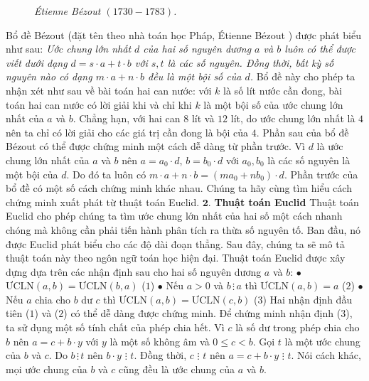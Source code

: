 \begin{multicols}{2}
\begin{figure}[H]
		\caption{\small\textit{\color{hoccungpi}Étienne Bézout $(1730 - 1783)$.}}
		\vspace*{-10pt}
	\end{figure}
	Bổ đề Bézout (đặt tên theo nhà toán học Pháp, Étienne Bézout ) được phát biểu như sau:
	\vskip 0.1cm
	\textit{Ước chung lớn nhất $d$ của hai số nguyên dương $a$ và $b$ luôn có thể được viết dưới dạng $d=s\cdot a+t\cdot b$ với $s,t$ là các số nguyên. Đồng thời, bất kỳ số nguyên nào có dạng $m\cdot a+n\cdot b$ đều là một bội số của $d$.}
	\vskip 0.1cm
	Bổ đề này cho phép ta nhận xét như sau về bài toán hai can nước: với $k$ là số lít nước cần đong, bài toán hai can nước có lời giải khi và chỉ khi $k$ là một bội số của ước chung lớn nhất của $a$ và $b$. Chẳng hạn, với hai can $8$ lít và $12$ lít, do ước chung lớn nhất là $4$ nên ta chỉ có lời giải cho các giá trị cần đong là bội của $4$.
	\vskip 0.1cm 
	Phần sau của bổ đề Bézout có thể được chứng minh một cách dễ dàng từ phần trước. Vì $d$ là ước chung lớn nhất của $a$ và $b$ nên $a=a_0\cdot d$, $b=b_0\cdot d$ với $a_0, b_0$ là các số nguyên là một bội của $d$. Do đó ta luôn có $m\cdot a+n\cdot b=(ma_0+nb_0)\cdot d$.
	\vskip 0.1cm
	Phần trước của bổ đề có một số cách chứng minh khác nhau. Chúng ta hãy cùng tìm hiểu cách chứng minh xuất phát từ thuật toán Euclid. 
	\vskip 0.1cm
	$\pmb{2.}$ \textbf{\color{hoccungpi}Thuật toán Euclid}
	\vskip 0.1cm
	Thuật toán Euclid cho phép chúng ta tìm ước chung lớn nhất của hai số một cách nhanh chóng mà không cần phải tiến hành phân tích ra thừa số nguyên tố. Ban đầu, nó được Euclid phát biểu cho các độ dài đoạn thẳng. Sau đây, chúng ta sẽ mô tả thuật toán này theo ngôn ngữ toán học hiện đại.
	\vskip 0.1cm
	Thuật toán Euclid được xây dựng dựa trên các nhận định sau cho hai số nguyên dương $a$ và $b$:
	\vskip 0.1cm
	$\bullet$ $\text{ƯCLN}(a,b) = \text{ƯCLN}(b,a)$					\hfill ($1$)
	\vskip 0.1cm
	$\bullet$ Nếu $a>0$ và $b \,\vdots \,a$ thì $\text{ƯCLN}(a,b) = a$			\hfill ($2$)
	\vskip 0.1cm
	$\bullet$ Nếu $a$ chia cho $b$ dư $c$ thì $\text{ƯCLN}(a,b) = \text{ƯCLN}(c,b)$		\hfill ($3$)
	\vskip 0.1cm
	Hai nhận định đầu tiên ($1$) và ($2$) có thể dễ dàng được chứng minh. Để chứng minh nhận định ($3$), ta sử dụng một số tính chất của phép chia hết. 
	\vskip 0.1cm
	Vì $c$ là số dư trong phép chia cho $b$ nên $a=c+b\cdot y$ với $y$ là một số không âm và $0 \le c < b$. Gọi $t$ là một ước chung của $b$ và $c$. Do $b\,\vdots\, t$ nên $b\cdot y\,\, \vdots\,\,t$. Đồng thời, $c\,\,\vdots\,\,t$ nên $a=c+b\cdot y\,\,\vdots\,\,t$. Nói cách khác, mọi ước chung của $b$ và $c$ cũng đều là ước chung của $a$ và $b$. 

\end{multicols}
